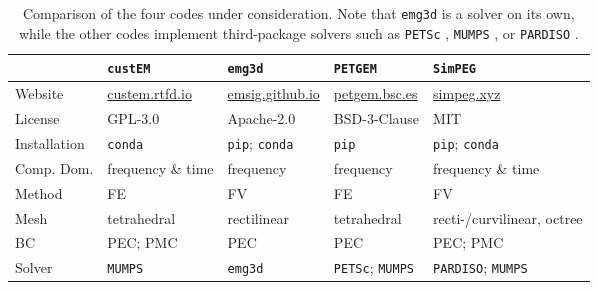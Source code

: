 \documentclass[a4paper, extra, camera,%
]{gji}
\newcommand{\simpeg}{\texttt{SimPEG}\xspace}
\newcommand{\custem}{\texttt{custEM}\xspace}
\newcommand{\petgem}{\texttt{PETGEM}\xspace}
\begin{document}
%
\begin{table}
\begin{minipage}{.9\linewidth}
  \centering
  \caption{Comparison of the four codes under consideration. Note that \texttt{emg3d} is a solver on its own, while the other codes implement third-package solvers such as \texttt{PETSc} \citep{Preprint.Abhyankar}, \texttt{MUMPS} \citep{SIAM.01.Amestoy}, or \texttt{PARDISO} \citep{FGCS.04.Schenk}.}
\label{tbl:codecomparison}
  \begin{tabularx}{\linewidth}{lXXXX}
  \toprule
  & \custem & \texttt{emg3d} & \petgem & \simpeg  \\
  \midrule
  Website & \href{https://custem.rtfd.io}{custem.rtfd.io}
          & \href{https://emsig.github.io}{emsig.github.io}
          & \href{http://petgem.bsc.es}{petgem.bsc.es}
          & \href{https://docs.simpeg.xyz}{simpeg.xyz} \\
  License & GPL-3.0 & Apache-2.0 & BSD-3-Clause & MIT \\
  Installation & \texttt{conda}
               & \texttt{pip}; \texttt{conda}
               & \texttt{pip}
               & \texttt{pip}; \texttt{conda} \\
  Comp. Dom. & frequency \& time & frequency & frequency & frequency \& time \\
  Method & FE & FV & FE & FV \\
  Mesh & tetrahedral & rectilinear & tetrahedral & recti-/curvilinear, octree \\
  BC & PEC; PMC & PEC & PEC & PEC; PMC \\
  Solver & \texttt{MUMPS} & \texttt{emg3d} & \texttt{PETSc}; \texttt{MUMPS} &
           \texttt{PARDISO}; \texttt{MUMPS} \\
  \bottomrule
\end{tabularx}
\end{minipage}
\end{table}
%
\end{document}
